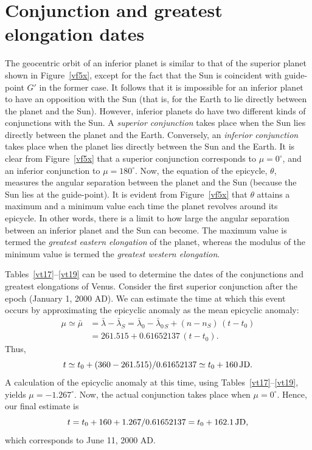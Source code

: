 \section{Conjunction and greatest elongation dates}
The geocentric orbit of an inferior planet is similar to that of the
superior planet shown in Figure~\ref{vf5x}, except for the fact that the Sun
is coincident with guide-point $G'$ in the former case.
It follows that it is impossible
for an inferior planet to have an opposition with the Sun (that is, for the
Earth to lie directly between the planet and the Sun). However, inferior planets
do have two different kinds of conjunctions with the Sun. A {\em superior
conjunction}\/ takes place when the Sun lies directly between the planet and the Earth.
Conversely, an {\em inferior conjunction}\/ takes place when the planet lies
directly between the Sun and the Earth. It is clear from Figure~\ref{vf5x}
that a superior conjunction corresponds to $\mu=0^\circ$, and
an inferior conjunction to $\mu=180^\circ$. Now, the equation of the epicycle,
 $\theta$, measures the
angular separation between the planet and the Sun (because the Sun lies at
the guide-point). It is evident from Figure~\ref{vf5x} that $\theta$ attains
a maximum and a minimum value each time the planet revolves
around its epicycle.
In other words, there is a limit to how large the angular separation between
an inferior planet and the Sun can become.
The maximum value is termed the {\em greatest eastern elongation}\/
of the planet, whereas the modulus of the minimum value is
termed the {\em greatest western elongation}. 

Tables~\ref{vt17}--\ref{vt19} can be used to determine the dates of the conjunctions  and greatest  elongations
of Venus. Consider the first superior conjunction after the epoch (January 1, 2000 AD). We can estimate the
time at which this event occurs by approximating the epicyclic anomaly as the 
mean epicyclic anomaly: 
\begin{align*}
\mu \simeq \bar{\mu} &= \bar{\lambda}-\bar{\lambda}_S = \bar{\lambda}_0-\bar{\lambda}_{0\,S} +
(n-n_S)\,(t-t_0)\\[0.5ex]& = 261.515 + 0.61652137\,(t-t_0).
\end{align*}
 Thus, 
$$
 t\simeq t_0 + (360-261.515)/0.61652137\simeq
t_0 + 160\, {\rm JD}.
$$
A calculation of the epicyclic anomaly at this time, using Tables~\ref{vt17}--\ref{vt19}, yields $\mu = -1.267^\circ$. Now, the actual conjunction
takes place when $\mu=0^\circ$. 
Hence, our final estimate is 
$$
t=t_0+160+1.267/0.61652137= t_0 + 162.1\,{\rm JD}, 
$$
which corresponds to June 11, 2000 AD.

